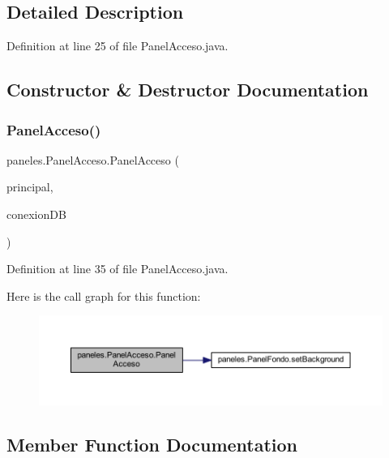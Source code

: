\subsection{Detailed Description}


Definition at line 25 of file Panel\+Acceso.\+java.



\subsection{Constructor \& Destructor Documentation}
\mbox{\label{classpaneles_1_1_panel_acceso_ab19590219a09f461529209808b8dbd25}} 
\subsubsection{\texorpdfstring{Panel\+Acceso()}{PanelAcceso()}}
{\footnotesize\ttfamily paneles.\+Panel\+Acceso.\+Panel\+Acceso (\begin{DoxyParamCaption}\item[{\mbox{\hyperlink{classvistas_1_1_principal}{Principal}}}]{principal,  }\item[{\mbox{\hyperlink{classmysql_1_1_conexion_j_d_b_c}{Conexion\+J\+D\+BC}}}]{conexion\+DB }\end{DoxyParamCaption})}



Definition at line 35 of file Panel\+Acceso.\+java.

Here is the call graph for this function\+:\nopagebreak
\begin{figure}[H]
\begin{center}
\leavevmode
\includegraphics[width=350pt]{classpaneles_1_1_panel_acceso_ab19590219a09f461529209808b8dbd25_cgraph}
\end{center}
\end{figure}


\subsection{Member Function Documentation}
\mbox{\label{classpaneles_1_1_panel_acceso_ac978a2c0e1aef22aa66b19abe354b02b}} 
